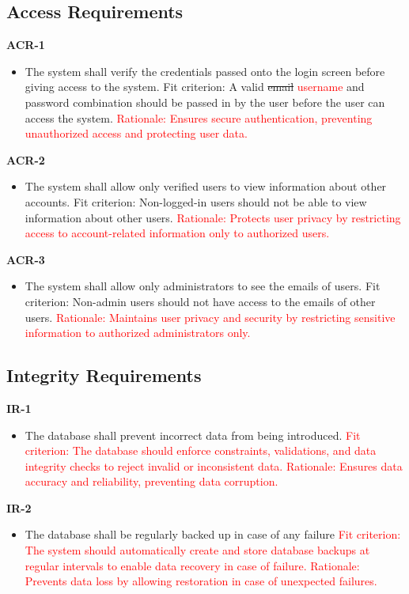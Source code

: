 \documentclass[12pt]{article}
\begin{document}
\subsection{Access Requirements}
\textbf{ACR-1}
\begin{itemize}
    \item The system shall verify the credentials passed onto the login screen before giving access to the system. \hfill \break
    Fit criterion: A valid \sout{email} \textcolor{red}{username} and password combination should be passed in by the user before the user can access the system.
    \hfill \break
    \textcolor{red} {Rationale: Ensures secure authentication, preventing unauthorized access and protecting user data.}
\end{itemize}
\textbf{ACR-2}
\begin{itemize}
    \item The system shall allow only verified users to view information about other accounts. \hfill \break
    Fit criterion: Non-logged-in users should not be able to view information about other users.
    \hfill \break
    \textcolor{red} {Rationale: Protects user privacy by restricting access to account-related information only to authorized users.}
\end{itemize}
\textbf{ACR-3}
\begin{itemize}
    \item The system shall allow only administrators to see the emails of users. \hfill \break
    Fit criterion: Non-admin users should not have access to the emails of other users.
    \hfill \break
    \textcolor{red} {Rationale: Maintains user privacy and security by restricting sensitive information to authorized administrators only.}
\end{itemize}

\subsection{Integrity Requirements}
\textbf{IR-1}
\begin{itemize}
    \item The database shall prevent incorrect data from being introduced.
    \hfill \break
    \textcolor{red} {Fit criterion: The database should enforce constraints, validations, and data integrity checks to reject invalid or inconsistent data.}
    \hfill \break
    \textcolor{red} {Rationale: Ensures data accuracy and reliability, preventing data corruption.}
\end{itemize}
\textbf{IR-2}
\begin{itemize}
    \item The database shall be regularly backed up in case of any failure
    \hfill \break
    \textcolor{red} {Fit criterion: The system should automatically create and store database backups at regular intervals to enable data recovery in case of failure.}
    \hfill \break
    \textcolor{red} {Rationale: Prevents data loss by allowing restoration in case of unexpected failures.}
\end{itemize}
\end{document}
